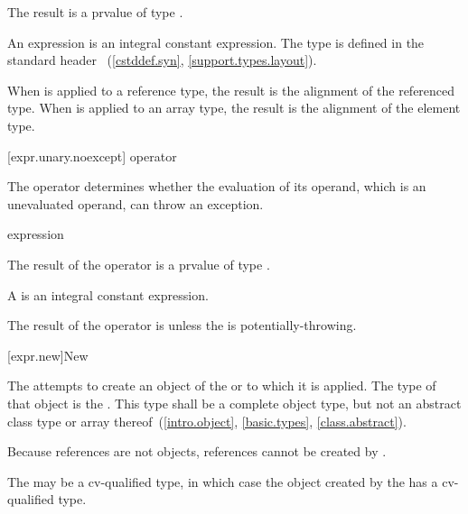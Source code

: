 \pnum
The result is a prvalue of type .
\begin{note}
An  expression
is an integral constant expression.
The type  is defined in the standard header
~(\ref{cstddef.syn}, \ref{support.types.layout}).
\end{note}

\pnum
When  is applied to a reference type, the result
is the alignment of the referenced type. When 
is applied to an array type, the result is the alignment of the
element type.

[expr.unary.noexcept]{ operator}

\pnum
{}%
%
The  operator determines whether the evaluation of its operand,
which is an unevaluated operand, can throw an
exception.

\begin{bnf}
\br
   \terminal{(} expression \terminal{)}
\end{bnf}

\pnum
The result of the  operator is a prvalue of type .
\begin{note}
A 
is an integral constant expression.
\end{note}

\pnum
The result of the  operator is 
unless the  is potentially-throwing.

[expr.new]{New}

\pnum
{}%
%
%
%
%
The  attempts to create an object of the
 or  to which
it is applied. The type of that object is the .
%
This type shall be a complete object type, but not an abstract class
type or array
thereof~(\ref{intro.object}, \ref{basic.types}, \ref{class.abstract}).
\begin{note}
Because references are not objects, references cannot be created by
.
\end{note}
\begin{note}
The  may be a cv-qualified type, in which case the
object created by the  has a cv-qualified type.
\end{note}

